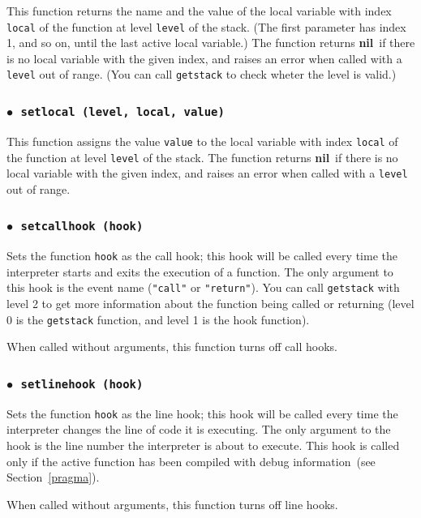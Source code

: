 \documentclass[11pt]{article}
\newcommand{\See}[1]{Section~\ref{#1}}
\newcommand{\see}[1]{(see \See{#1})}
\newcommand{\T}[1]{{\tt #1}}
\newcommand{\nil}{{\bf nil}}
\newcommand{\Deffunc}[1]{\index{#1}}
\newcommand{\ff}{$\bullet$\ }
\begin{document}
This function returns the name and the value of the local variable
with index \verb|local| of the function at level \verb|level| of the stack.
(The first parameter has index 1, and so on,
until the last active local variable.)
The function returns \nil\ if there is no local
variable with the given index,
and raises an error when called with a \verb|level| out of range.
(You can call \verb|getstack| to check wheter the level is valid.)

\subsubsection*{\ff \T{setlocal (level, local, value)}}\Deffunc{setlocal}

This function assigns the value \verb|value| to the local variable
with index \verb|local| of the function at level \verb|level| of the stack.
The function returns \nil\ if there is no local
variable with the given index,
and raises an error when called with a \verb|level| out of range.

\subsubsection*{\ff \T{setcallhook (hook)}}\Deffunc{setcallhook}

Sets the function \verb|hook| as the call hook;
this hook will be called every time the interpreter starts and
exits the execution of a function.
The only argument to this hook is the event name (\verb|"call"| or
\verb|"return"|).
You can call \verb|getstack| with level 2 to get more information about
the function being called or returning
(level 0 is the \verb|getstack| function,
and level 1 is the hook function).

When called without arguments,
this function turns off call hooks.

\subsubsection*{\ff \T{setlinehook (hook)}}\Deffunc{setlinehook}

Sets the function \verb|hook| as the line hook;
this hook will be called every time the interpreter changes
the line of code it is executing.
The only argument to the hook is the line number the interpreter
is about to execute.
This hook is called only if the active function
has been compiled with debug information~\see{pragma}.

When called without arguments,
this function turns off line hooks.
\end{document}
